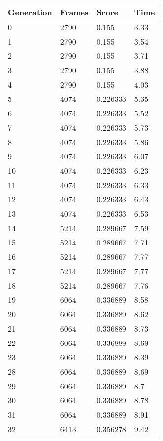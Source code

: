 \begin{table}
\caption{GPU Results}
\centering
 \begin{longtable}{ | l | l | l | l |}
    \hline
    Generation & Frames & Score & Time \\ \hline
    0 & 2790 & 0.155 & 3.33 \\ \hline
    1 & 2790 & 0.155 & 3.54 \\ \hline
    2 & 2790 & 0.155 & 3.71 \\ \hline
    3 & 2790 & 0.155 & 3.88 \\ \hline
    4 & 2790 & 0.155 & 4.03 \\ \hline
    5 & 4074 & 0.226333 & 5.35 \\ \hline
    6 & 4074 & 0.226333 & 5.52 \\ \hline
    7 & 4074 & 0.226333 & 5.73 \\ \hline
    8 & 4074 & 0.226333 & 5.86 \\ \hline
    9 & 4074 & 0.226333 & 6.07 \\ \hline
    10 & 4074 & 0.226333 & 6.23 \\ \hline
    11 & 4074 & 0.226333 & 6.33 \\ \hline
    12 & 4074 & 0.226333 & 6.43 \\ \hline
    13 & 4074 & 0.226333 & 6.53 \\ \hline
    14 & 5214 & 0.289667 & 7.59 \\ \hline
    15 & 5214 & 0.289667 & 7.71 \\ \hline
    16 & 5214 & 0.289667 & 7.77 \\ \hline
    17 & 5214 & 0.289667 & 7.77 \\ \hline
    18 & 5214 & 0.289667 & 7.76 \\ \hline
    19 & 6064 & 0.336889 & 8.58 \\ \hline
    20 & 6064 & 0.336889 & 8.62 \\ \hline
    21 & 6064 & 0.336889 & 8.73 \\ \hline
    22 & 6064 & 0.336889 & 8.69 \\ \hline
    23 & 6064 & 0.336889 & 8.39 \\ \hline
    28 & 6064 & 0.336889 & 8.69 \\ \hline
    29 & 6064 & 0.336889 & 8.7 \\ \hline
    30 & 6064 & 0.336889 & 8.78 \\ \hline
    31 & 6064 & 0.336889 & 8.91 \\ \hline
    32 & 6413 & 0.356278 & 9.42 \\ \hline

\end{longtable}
\end{table}
